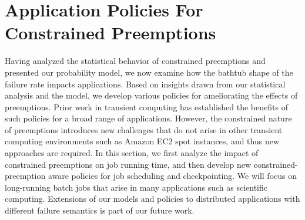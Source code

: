 \vspace*{\subsecspace}
\section{Application Policies For Constrained Preemptions}
\label{sec:policies}
Having analyzed the statistical behavior of constrained preemptions and presented our probability model, we now examine how the bathtub shape of the failure rate impacts applications. 
Based on insights drawn from our statistical analysis and the model, we develop various policies for ameliorating the effects of preemptions. 
Prior work in transient computing has established the benefits of such policies for a broad range of applications. 
However, the constrained nature of preemptions introduces new challenges that do not arise in other transient computing environments such as Amazon EC2 spot instances, and thus new approaches are required. 
In this section, we first analyze the impact of constrained preemptions on job running time, and then develop new constrained-preemption aware policies for job scheduling and checkpointing. 
We will focus on long-running batch jobs that arise in many applications such as scientific computing. Extensions of our models and policies to distributed applications with different failure semantics is part of our future work. 







